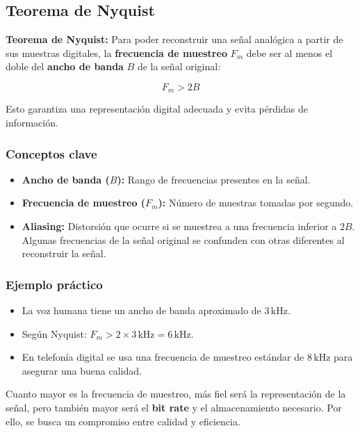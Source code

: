 \documentclass[11pt,a4paper]{article}
\begin{document}
\subsection{Teorema de Nyquist}

\begin{DefBox}
\textbf{Teorema de Nyquist:}
Para poder reconstruir una señal analógica a partir de sus muestras digitales, la \textbf{frecuencia de muestreo} $F_m$ debe ser al menos el doble del \textbf{ancho de banda} $B$ de la señal original:

\[
F_m > 2B
\]

Esto garantiza una representación digital adecuada y evita pérdidas de información.
\end{DefBox}

\subsubsection*{Conceptos clave}
\begin{itemize}
  \item \textbf{Ancho de banda ($B$):} Rango de frecuencias presentes en la señal.
  \item \textbf{Frecuencia de muestreo ($F_m$):} Número de muestras tomadas por segundo.
  \item \textbf{Aliasing:} Distorsión que ocurre si se muestrea a una frecuencia inferior a $2B$.
  Algunas frecuencias de la señal original se confunden con otras diferentes al reconstruir la señal.
\end{itemize}

\subsubsection*{Ejemplo práctico}
\begin{itemize}
  \item La voz humana tiene un ancho de banda aproximado de $3\,\text{kHz}$.
  \item Según Nyquist: $F_m > 2 \times 3\,\text{kHz} = 6\,\text{kHz}$.
  \item En telefonía digital se usa una frecuencia de muestreo estándar de $8\,\text{kHz}$ para asegurar una buena calidad.
\end{itemize}

\begin{NotaBox}
Cuanto mayor es la frecuencia de muestreo, más fiel será la representación de la señal, pero también mayor será el \textbf{bit rate} y el almacenamiento necesario.
Por ello, se busca un compromiso entre calidad y eficiencia.
\end{NotaBox}
\end{document}

